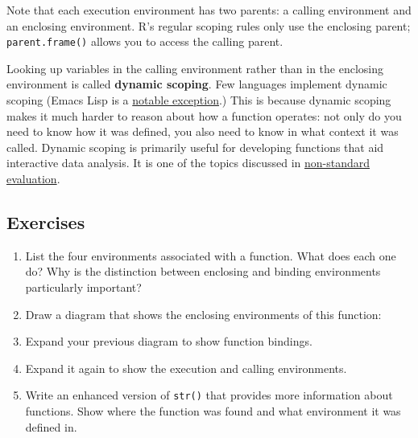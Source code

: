 Note that each execution environment has two parents: a calling
environment and an enclosing environment. R's regular scoping rules only
use the enclosing parent; \texttt{parent.frame()} allows you to access
the calling parent.

Looking up variables in the calling environment rather than in the
enclosing environment is called \textbf{dynamic scoping}. Few languages
implement dynamic scoping (Emacs Lisp is a
\href{http://www.gnu.org/software/emacs/emacs-paper.html\#SEC15}{notable
exception}.) This is because dynamic scoping makes it much harder to
reason about how a function operates: not only do you need to know how
it was defined, you also need to know in what context it was called.
Dynamic scoping is primarily useful for developing functions that aid
interactive data analysis. It is one of the topics discussed in
\hyperref[nse]{non-standard evaluation}. 

\subsection{Exercises}

\begin{enumerate}
\def\labelenumi{\arabic{enumi}.}
\item
  List the four environments associated with a function. What does each
  one do? Why is the distinction between enclosing and binding
  environments particularly important?
\item
  Draw a diagram that shows the enclosing environments of this function:

\begin{Shaded}
\begin{Highlighting}[]
\StringTok{ }
  \StringTok{ }
    \StringTok{ }
      \StringTok{ }\StringTok{ }
    \NormalTok{\}}
    \NormalTok{(}\NormalTok{)}
  \NormalTok{\}}
  \NormalTok{(}\NormalTok{)}
\NormalTok{\}}
\NormalTok{(}\NormalTok{)}
\end{Highlighting}
\end{Shaded}
\item
  Expand your previous diagram to show function bindings.
\item
  Expand it again to show the execution and calling environments.
\item
  Write an enhanced version of \texttt{str()} that provides more
  information about functions. Show where the function was found and
  what environment it was defined in.
\end{enumerate}

